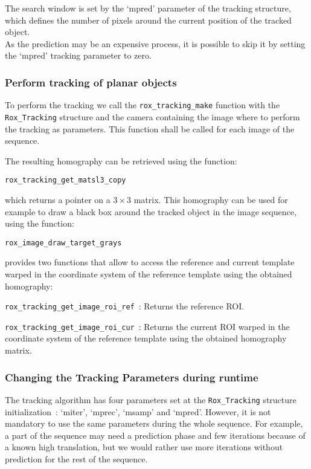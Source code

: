 The search window is set by the `mpred' parameter of the tracking
structure, which defines the number of pixels around the current
position of the tracked object.\\

As the prediction may be an expensive process, it is possible to skip it by
setting the `mpred' tracking parameter to zero.

\subsubsection{Perform tracking of planar objects}
\label{sss:tracking_perform}

To perform the tracking we call the \lstinline$rox_tracking_make$ function with the \lstinline$Rox_Tracking$ structure 
and the camera containing the image where to perform the tracking as parameters. This function shall be called for each image of the sequence. 

The resulting homography can be retrieved using the function:
\begin{lstlisting}
rox_tracking_get_matsl3_copy
\end{lstlisting}

which
returns a pointer on a $3 \times 3$ matrix. This homography can be used for example to draw a black box around the tracked
object in the image sequence, using the function:
\begin{lstlisting}
rox_image_draw_target_grays
\end{lstlisting}

\rox{} provides two functions that allow to access the reference and current template warped in the coordinate system 
of the reference template using the obtained homography:
\begin{description}
  \item \lstinline$rox_tracking_get_image_roi_ref$~: Returns the reference ROI.
  \item \lstinline$rox_tracking_get_image_roi_cur$~: Returns the current ROI warped in the coordinate system of the reference template using the obtained homography matrix.
\end{description}

\subsubsection{Changing the Tracking Parameters during runtime}
\label{sss:track2D_setparam}

The tracking algorithm has four parameters set at the
\lstinline$Rox_Tracking$ structure initialization~: `miter', `mprec',
`msamp' and `mpred'. However, it is not mandatory to use the same
parameters during the whole sequence. For example, a part of the
sequence may need a prediction phase and few iterations because of a
known high translation, but we would rather use more iterations
without prediction for the rest of the sequence.\\

